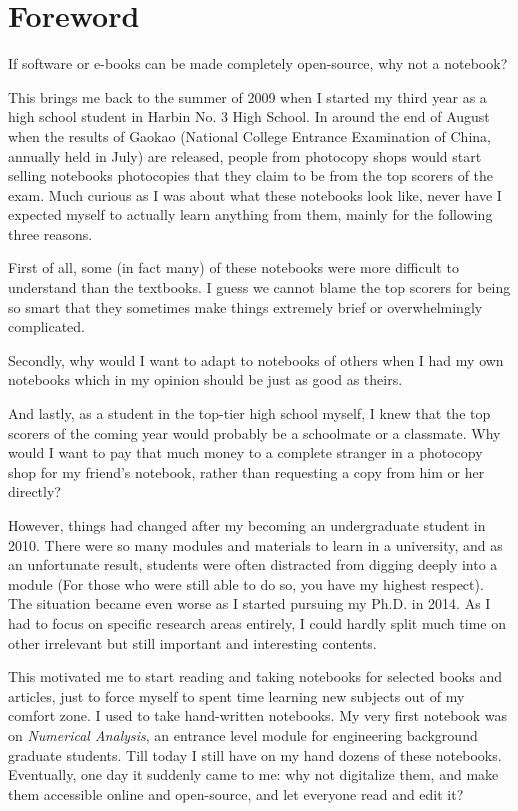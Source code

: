 \chapter*{Foreword}
If software or e-books can be made completely open-source, why not a notebook?

This brings me back to the summer of 2009 when I started my third year as a high school student in Harbin No. 3 High School. In around the end of August when the results of Gaokao (National College Entrance Examination of China, annually held in July) are released, people from photocopy shops would start selling notebooks photocopies that they claim to be from the top scorers of the exam. Much curious as I was about what these notebooks look like, never have I expected myself to actually learn anything from them, mainly for the following three reasons.

First of all, some (in fact many) of these notebooks were more difficult to understand than the textbooks. I guess we cannot blame the top scorers for being so smart that they sometimes make things extremely brief or overwhelmingly complicated.

Secondly, why would I want to adapt to notebooks of others when I had my own notebooks which in my opinion should be just as good as theirs.

And lastly, as a student in the top-tier high school myself, I knew that the top scorers of the coming year would probably be a schoolmate or a classmate. Why would I want to pay that much money to a complete stranger in a photocopy shop for my friend's notebook, rather than requesting a copy from him or her directly?

However, things had changed after my becoming an undergraduate student in 2010. There were so many modules and materials to learn in a university, and as an unfortunate result, students were often distracted from digging deeply into a module (For those who were still able to do so, you have my highest respect). The situation became even worse as I started pursuing my Ph.D. in 2014. As I had to focus on specific research areas entirely, I could hardly split much time on other irrelevant but still important and interesting contents.

This motivated me to start reading and taking notebooks for selected books and articles, just to force myself to spent time learning new subjects out of my comfort zone. I used to take hand-written notebooks. My very first notebook was on \textit{Numerical Analysis}, an entrance level module for engineering background graduate students. Till today I still have on my hand dozens of these notebooks. Eventually, one day it suddenly came to me: why not digitalize them, and make them accessible online and open-source, and let everyone read and edit it?


